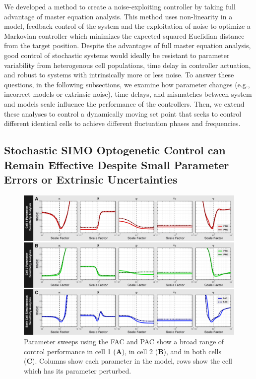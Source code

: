 \documentclass[12pt]{iopart}
\begin{document}
We developed a method to create a noise-exploiting controller by taking full advantage of master equation analysis. This method uses non-linearity in a model, feedback control of the system and the exploitation of noise to optimize a Markovian controller which minimizes the expected squared Euclidian distance from the target position. Despite the advantages of full master equation analysis, good control of stochastic systems would ideally be resistant to parameter variability from heterogenous cell populations, time delay in controller actuation, and robust to systems with intrinsically more or less noise. To answer these questions, in the following subsections, we examine how parameter changes (e.g., incorrect models or extrinsic noise), time delays, and mismatches between system and models scale influence the performance of the controllers.
Then, we extend these analyses to control a dynamically moving set point that seeks to control different identical cells to achieve different fluctuation phases and frequencies. 

\subsection{Stochastic SIMO Optogenetic Control can Remain Effective Despite Small Parameter Errors or Extrinsic Uncertainties}
\begin{figure}
\begin{center}
\includegraphics[width=1\textwidth]{ParameterPerturbation.pdf}
\caption{Parameter sweeps using the FAC and PAC show a broad range of control performance in cell 1 ({\bf A}),  in cell 2 ({\bf B}), and in both cells ({\bf C}). Columns show each parameter in the model, rows show the cell which has its parameter perturbed. }
\label{Parameter}
\end{center}
\end{figure}
\end{document}
